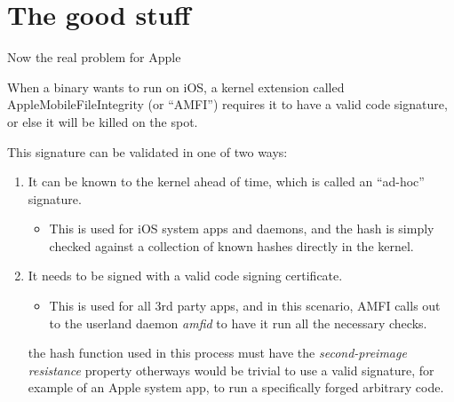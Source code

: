 \documentclass{beamer}
\begin{document}
\section{The good stuff}
\begin{frame}[fragile]{Now the real problem for Apple}
\begin{flushleft}
When a binary wants to run on iOS, a kernel extension called AppleMobileFileIntegrity (or “AMFI”) requires it to have a valid code signature, or else it will be killed on the spot.
\vfill\par This signature can be validated in one of two ways:
\begin{enumerate}
    \item \small It can be known to the kernel ahead of time, which is called an “ad-hoc” signature.
    \begin{itemize}
     \item \footnotesize This is used for iOS system apps and daemons, and the hash is simply checked against a collection of known hashes directly in the kernel.
   \end{itemize}
    \item \small It needs to be signed with a valid code signing certificate.
    \begin{itemize}
     \item \footnotesize This is used for all 3rd party apps, and in this scenario, AMFI calls out to the userland daemon \emph{amfid} to have it run all the necessary checks.
   \end{itemize}
\vfill
\color{red}{NB: } the hash function used in this process must have the \emph{second-preimage resistance} property otherways would be trivial to use a valid signature, for example of an Apple system app, to run a specifically forged arbitrary code.
\end{enumerate}
\end{flushleft}
\end{frame}
\end{document}
